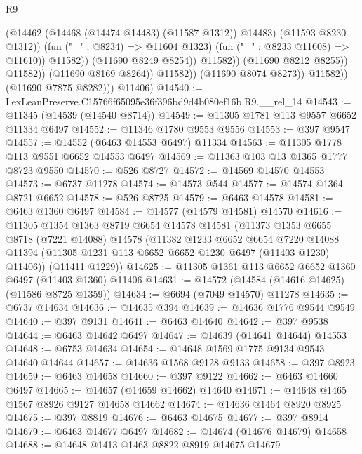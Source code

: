 \begin{lexlean}{R9}
\begin{coremodule}
                                          (@14462 (@14468 (@14474 @14483) (@11587 @1312)) @14483)
                                          (@11593 @8230 @1312))
                                        (fun ("_" : @8234) => @11604 @1323)
                                        (fun ("_" : @8233 @11608) => @11610))
                                      @11582))
                                  (@11690 @8249 @8254))
                                @11582))
                            (@11690 @8212 @8255))
                          @11582))
                      (@11690 @8169 @8264))
                    @11582))
                (@11690 @8074 @8273))
              @11582))
          (@11690 @7875 @8282)))
      @11406)
@14540 := LexLeanPreserve.C15766f65095e36f396bd9d4b080ef16b.R9.__rel_14
@14543 := @11345 (@14539 (@14540 @8714))
@14549 := @11305 @1781 @113 @9557 @6652 @11334 @6497
@14552 := @11346 @1780 @9553 @9556
@14553 := @397 @9547
@14557 := @14552 (@6463 @14553 @6497) @11334
@14563 := @11305 @1778 @113 @9551 @6652 @14553 @6497
@14569 := @11363 @103 @13 @1365 @1777 @8723 @9550
@14570 := @526 @8727
@14572 := @14569 @14570 @14553
@14573 := @6737 @11278
@14574 := @14573 @544
@14577 := @14574 @1364 @8721 @6652
@14578 := @526 @8725
@14579 := @6463 @14578
@14581 := @6463 @1360 @6497
@14584 := @14577 (@14579 @14581) @14570
@14616 := @11305
    @1354
    @1363
    @8719
    @6654
    @14578
    @14581
    (@11373
      @1353
      @6655
      @8718
      (@7221 @14088)
      @14578
      (@11382
        @1233
        @6652
        @6654
        @7220
        @14088
        @11394
        (@11305 @1231 @113 @6652 @6652 @1230 @6497 (@11403 @1230) @11406))
      (@11411 @1229))
@14625 := @11305 @1361 @113 @6652 @6652 @1360 @6497 (@11403 @1360) @11406
@14631 := @14572 (@14584 (@14616 @14625) (@11586 @8725 @1359))
@14634 := @6694 (@7049 @14570) @11278
@14635 := @6737 @14634
@14636 := @14635 @394
@14639 := @14636 @1776 @9544 @9549
@14640 := @397 @9131
@14641 := @6463 @14640
@14642 := @397 @9538
@14644 := @6463 @14642 @6497
@14647 := @14639 (@14641 @14644) @14553
@14648 := @6753 @14634
@14654 := @14648 @1569 @1775 @9134 @9543 @14640 @14644
@14657 := @14636 @1568 @9128 @9133
@14658 := @397 @8923
@14659 := @6463 @14658
@14660 := @397 @9122
@14662 := @6463 @14660 @6497
@14665 := @14657 (@14659 @14662) @14640
@14671 := @14648 @1465 @1567 @8926 @9127 @14658 @14662
@14674 := @14636 @1464 @8920 @8925
@14675 := @397 @8819
@14676 := @6463 @14675
@14677 := @397 @8914
@14679 := @6463 @14677 @6497
@14682 := @14674 (@14676 @14679) @14658
@14688 := @14648 @1413 @1463 @8822 @8919 @14675 @14679

\end{coremodule}
\end{lexlean}

